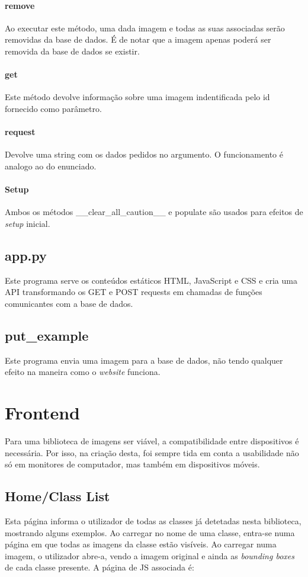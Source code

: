 \documentclass{report}
\begin{document}
\paragraph{remove}
Ao executar este método, uma dada imagem e todas as suas associadas serão removidas da base de dados. É de notar que a imagem apenas poderá ser removida da base de dados se existir.

\paragraph{get}
Este método devolve informação sobre uma imagem indentificada pelo id fornecido como parâmetro. 

\paragraph{request}
Devolve uma string com os dados pedidos no argumento. O funcionamento é analogo ao do enunciado.

\paragraph{Setup}
Ambos os métodos \_\_clear\_all\_caution\_\_ e  populate são usados para efeitos de \textit{setup} inicial.

\subsection{app.py}
Este programa serve os conteúdos estáticos HTML, JavaScript e CSS e cria uma API transformando os GET e POST requests em chamadas de funções comunicantes com a base de dados. 

\subsection{put\_example}
Este programa envia uma imagem para a base de dados, não tendo qualquer efeito na maneira como o \textit{website} funciona.

\section{Frontend}
Para uma biblioteca de imagens ser viável, a compatibilidade entre dispositivos é necessária. Por isso, na criação desta, foi sempre tida em conta a usabilidade não só em monitores de computador, mas também em dispositivos móveis. 

\subsection{Home/Class List}
Esta página informa o utilizador de todas as classes já detetadas nesta biblioteca, mostrando alguns exemplos. Ao carregar no nome de uma classe, entra-se numa página em que todas as imagens da classe estão visíveis. Ao carregar numa imagem, o utilizador abre-a, vendo a imagem original e ainda as \textit{bounding boxes} de cada classe presente. A página de JS associada é:
\end{document}
